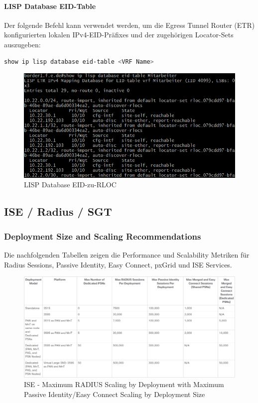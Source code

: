 \paragraph{LISP Database EID-Table}
Der folgende Befehl kann verwendet werden, um die Egress Tunnel Router (ETR) konfigurierten lokalen IPv4-EID-Präfixes und der zugehörigen Locator-Sets auszugeben:

\begin{lstlisting}[language=bash]
show ip lisp database eid-table <VRF Name>
\end{lstlisting}

\begin{figure}[H]
	\centering
	\includegraphics[width=0.8\linewidth]{img/Absicherung/lisp_eid-table-database-rloc}
	\caption{LISP Database EID-zu-RLOC}
	\label{fig:LISP Database EID-zu-RLOC}
\end{figure}






\subsection{ISE / Radius / SGT}

\subsubsection{Deployment Size and Scaling Recommendations}

Die nachfolgenden Tabellen zeigen die Performance und Scalability Metriken für Radius Sessions, Passive Identity, Easy Connect, pxGrid und ISE Services.

\begin{figure}[H]
	\centering
	\includegraphics[width=1\linewidth]{img/Absicherung/ISE-MaxRadiusScaling}
	\caption{ISE - Maximum RADIUS Scaling by Deployment with Maximum Passive Identity/Easy Connect Scaling by Deployment Size \cite{ise-scale}}
	\label{fig:ISE - Maximum RADIUS Scaling}
\end{figure}

